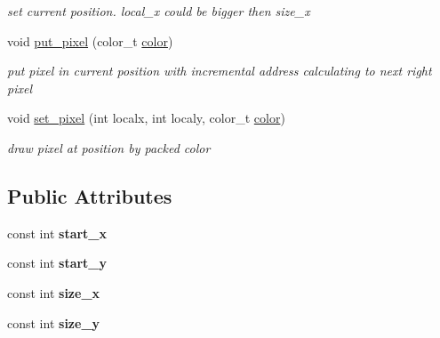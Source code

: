 \begin{DoxyCompactItemize}
\begin{DoxyCompactList}\small\item\em set current position. local\+\_\+x could be bigger then size\+\_\+x \end{DoxyCompactList}\item 
\hypertarget{classdrawing__area_ade68ff7564fbccb60151b2d6d2a33ae6}{}void \hyperlink{classdrawing__area_ade68ff7564fbccb60151b2d6d2a33ae6}{put\+\_\+pixel} (color\+\_\+t \hyperlink{structcolor}{color})\label{classdrawing__area_ade68ff7564fbccb60151b2d6d2a33ae6}

\begin{DoxyCompactList}\small\item\em put pixel in current position with incremental address calculating to next right pixel \end{DoxyCompactList}\item 
\hypertarget{classdrawing__area_a986d85b410492f3d81c08ca944daac40}{}void \hyperlink{classdrawing__area_a986d85b410492f3d81c08ca944daac40}{set\+\_\+pixel} (int localx, int localy, color\+\_\+t \hyperlink{structcolor}{color})\label{classdrawing__area_a986d85b410492f3d81c08ca944daac40}

\begin{DoxyCompactList}\small\item\em draw pixel at position by packed color \end{DoxyCompactList}\end{DoxyCompactItemize}
\subsection*{Public Attributes}
\begin{DoxyCompactItemize}
\item 
\hypertarget{classdrawing__area_af3b818796c0db5eb8eea4b0c98ac0c36}{}const int {\bfseries start\+\_\+x}\label{classdrawing__area_af3b818796c0db5eb8eea4b0c98ac0c36}

\item 
\hypertarget{classdrawing__area_adca56ee41c1ee5cf86ea8865092d91bc}{}const int {\bfseries start\+\_\+y}\label{classdrawing__area_adca56ee41c1ee5cf86ea8865092d91bc}

\item 
\hypertarget{classdrawing__area_a9461ee95149286b0730d8c4a1e69f278}{}const int {\bfseries size\+\_\+x}\label{classdrawing__area_a9461ee95149286b0730d8c4a1e69f278}

\item 
\hypertarget{classdrawing__area_abee9dfdca01f66b5c8ab592fd48eb9c1}{}const int {\bfseries size\+\_\+y}\label{classdrawing__area_abee9dfdca01f66b5c8ab592fd48eb9c1}

\end{DoxyCompactItemize}


